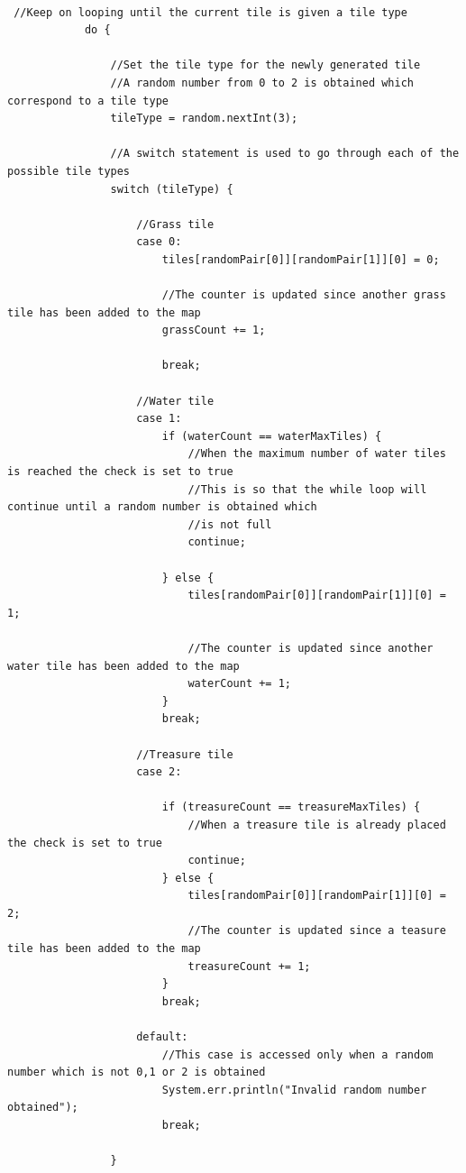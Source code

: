 \documentclass[a4paper,12pt]{extarticle}
\begin{document}
\begin{lstlisting}

 //Keep on looping until the current tile is given a tile type
            do {

                //Set the tile type for the newly generated tile
                //A random number from 0 to 2 is obtained which correspond to a tile type
                tileType = random.nextInt(3);

                //A switch statement is used to go through each of the possible tile types
                switch (tileType) {

                    //Grass tile
                    case 0:
                        tiles[randomPair[0]][randomPair[1]][0] = 0;

                        //The counter is updated since another grass tile has been added to the map
                        grassCount += 1;

                        break;

                    //Water tile
                    case 1:
                        if (waterCount == waterMaxTiles) {
                            //When the maximum number of water tiles is reached the check is set to true
                            //This is so that the while loop will continue until a random number is obtained which
                            //is not full
                            continue;

                        } else {
                            tiles[randomPair[0]][randomPair[1]][0] = 1;

                            //The counter is updated since another water tile has been added to the map
                            waterCount += 1;
                        }
                        break;

                    //Treasure tile
                    case 2:

                        if (treasureCount == treasureMaxTiles) {
                            //When a treasure tile is already placed the check is set to true
                            continue;
                        } else {
                            tiles[randomPair[0]][randomPair[1]][0] = 2;
                            //The counter is updated since a teasure tile has been added to the map
                            treasureCount += 1;
                        }
                        break;

                    default:
                        //This case is accessed only when a random number which is not 0,1 or 2 is obtained
                        System.err.println("Invalid random number obtained");
                        break;

                }
                
\end{lstlisting}
\vspace{4mm}
\end{document}
